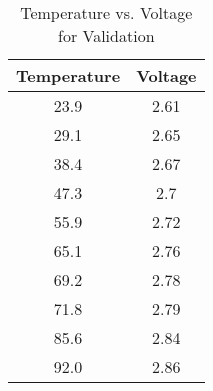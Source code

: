 \documentclass{article}
\begin{document}
\begin{table}[H]
  \centering
  \caption{Temperature vs. Voltage for Validation}
  \vspace{1cm}
  \label{tab:validation_data_simple}
  \begin{tabular}{|c|c|}
    \hline
    \textbf{Temperature} & \textbf{Voltage} \\
    \hline
    23.9 & 2.61 \\
    29.1 & 2.65 \\
    38.4 & 2.67 \\
    47.3 & 2.7 \\
    55.9 & 2.72 \\
    65.1 & 2.76 \\
    69.2 & 2.78 \\
    71.8 & 2.79 \\
    85.6 & 2.84 \\
    92.0 & 2.86 \\
    \hline
  \end{tabular}
\end{table}
\end{document}
